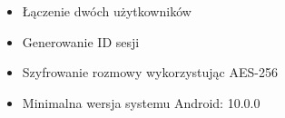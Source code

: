 \begin{itemize}
\item Łączenie dwóch użytkowników
\item Generowanie ID sesji
\item Szyfrowanie rozmowy wykorzystując AES-256
\item Minimalna wersja systemu Android: 10.0.0
\end{itemize}
